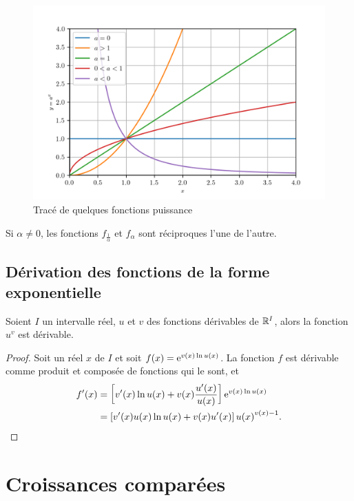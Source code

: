 \begin{figure}
  \centering
  \includegraphics[scale = 0.7]{puiss.png}
  \caption{Tracé de quelques fonctions
  puissance}\label{figtracepuissance}
\end{figure}

Si \(\alpha \neq 0\), les fonctions \(f_{\frac{1}{\alpha}}\) et
\(f_\alpha\) sont réciproques l'une de l'autre.

\subsection{Dérivation des fonctions de la forme
exponentielle}\label{subsec:chap1-derivationdesfonctionsdelaformeexponentielle}

\begin{prop}
  Soient \(I\) un intervalle réel, \(u\) et \(v\) des fonctions
  dérivables de \(\mathbb{R}^{I}\), alors la fonction \(u^v\) est dérivable.
\end{prop}
\begin{proof}
  Soit un réel \(x\) de \(I\) et soit \(f(x) = \operatorname{e}^{v(x) \ln u(x)}\).  La
  fonction \(f\) est dérivable comme produit et composée de fonctions qui
  le sont, et
  \begin{align*}
    f'(x) & = \left[ v'(x) \ln u(x) + v(x) \frac{u'(x)}{u(x)}
    \right]\operatorname{e}^{v(x) \ln u(x)} \\
    &= \left[v'(x)u(x)\ln u(x) + v(x) u'(x) \right]{u(x)}^{v(x)-1}.
  \end{align*}
\end{proof}

\section{Croissances comparées}\label{sec:chap1-croissancescomparees}

